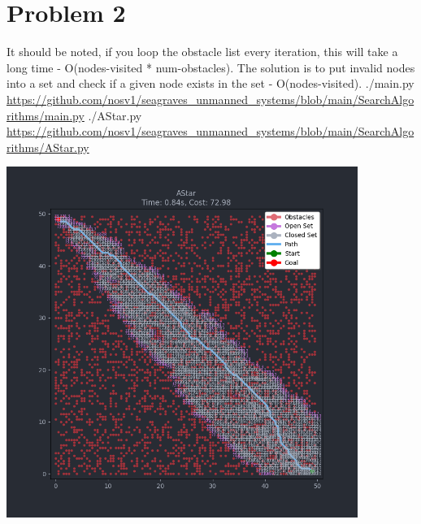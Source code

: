 \documentclass{article}
\begin{document}
        \section*{Problem 2}
            \begin{minipage}{\linewidth}
                \raggedright
                It should be noted, if you loop the obstacle list every iteration, this will take a long time - O(nodes-visited * num-obstacles). The solution is to put invalid nodes into a set and check if a given node exists in the set - O(nodes-visited). \break 
                \break
                ./main.py \break
                \url{https://github.com/nosv1/seagraves_unmanned_systems/blob/main/SearchAlgorithms/main.py} \break
                ./AStar.py \break
                \url{https://github.com/nosv1/seagraves_unmanned_systems/blob/main/SearchAlgorithms/AStar.py}
                \begin{center}
                    \includegraphics[height=4.5in]{HW3P2 AStar.png}
                \end{center}
            \end{minipage}
\end{document}
